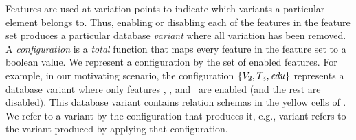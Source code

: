 Features are used at variation points to indicate which variants a particular
element belongs to.
Thus, enabling or disabling each of
the features in the feature set
produces a particular database \emph{variant} where
all variation has been removed. 
A \emph{configuration} is a \emph{total} function
that maps every feature in the feature set to a boolean value.
We represent a configuration by the set of enabled features.
For example, in our motivating scenario, the configuration \ensuremath{
\setDef {\vTwo,\tThree,\edu}
}
represents a database variant where only features \vTwo, \tThree, and \edu\ are
enabled (and the rest are disabled).
This database variant contains relation schemas in the yellow cells of .
We refer to a variant by the configuration that produces it, e.g.,
variant \setDef {\vTwo,\tThree,\edu} refers to the variant produced by applying
that configuration.

